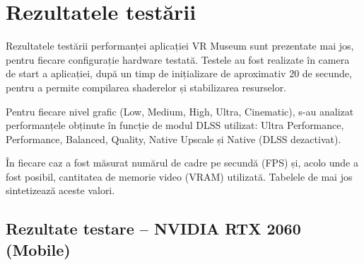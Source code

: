 \section{Rezultatele testării}
Rezultatele testării performanței aplicației VR Museum sunt prezentate mai jos, pentru fiecare configurație hardware testată. Testele au fost realizate în camera de start a aplicației, după un timp de inițializare de aproximativ 20 de secunde, pentru a permite compilarea shaderelor și stabilizarea resurselor.

Pentru fiecare nivel grafic (Low, Medium, High, Ultra, Cinematic), s-au analizat performanțele obținute în funcție de modul DLSS utilizat: Ultra Performance, Performance, Balanced, Quality, Native Upscale și Native (DLSS dezactivat).

În fiecare caz a fost măsurat numărul de cadre pe secundă (FPS) și, acolo unde a fost posibil, cantitatea de memorie video (VRAM) utilizată. Tabelele de mai jos sintetizează aceste valori.
\clearpage

\subsection*{Rezultate testare – NVIDIA RTX 2060 (Mobile)}

